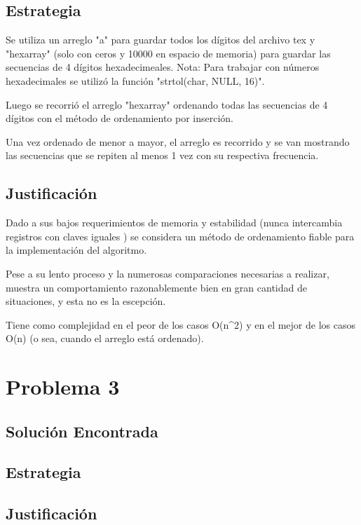 \documentclass[12pt]{article}
\begin{document}
\subsection{Estrategia}

Se utiliza un arreglo "a" para guardar todos los dígitos del archivo tex y "hexarray" (solo con ceros y 10000 en espacio de memoria) para guardar las secuencias de 4 dígitos hexadecimeales.
Nota: Para trabajar con números hexadecimales se utilizó la función "strtol(char, NULL, 16)". 

Luego se recorrió el arreglo "hexarray" ordenando todas las secuencias de 4 dígitos con el método de ordenamiento por inserción.

Una vez ordenado de menor a mayor, el arreglo es recorrido y se van mostrando las secuencias que se repiten al menos 1 vez con su respectiva frecuencia.

\subsection{Justificación}

Dado a sus bajos requerimientos de memoria y estabilidad (nunca intercambia registros con claves iguales ) se considera un método de ordenamiento fiable para la implementación del algoritmo.

Pese a su lento proceso y la numerosas comparaciones necesarias a realizar, muestra un comportamiento razonablemente bien en gran cantidad de situaciones, y esta no es la escepción.

Tiene como complejidad en el peor de los casos O(n^2) y en el mejor de los casos O(n) (o sea, cuando el arreglo está ordenado).


\section{Problema 3}

\subsection{Solución Encontrada}

\subsection{Estrategia}

\subsection{Justificación}
\end{document}
